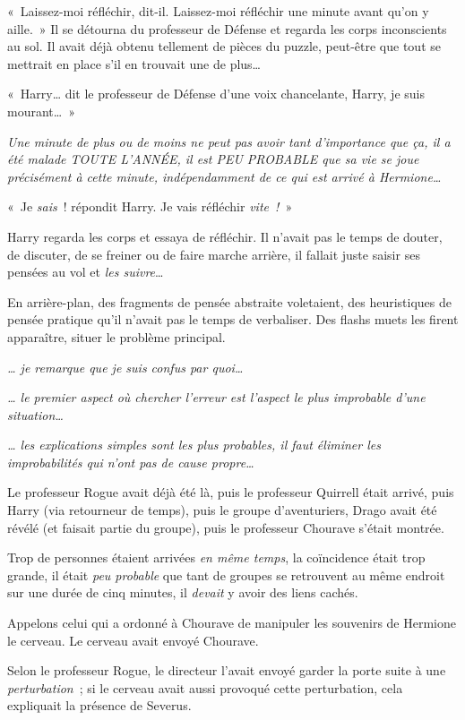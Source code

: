«~Laissez-moi réfléchir, dit-il.
Laissez-moi réfléchir une minute avant qu'on y aille.~»
Il se détourna du professeur de Défense et regarda les corps inconscients au sol.
Il avait déjà obtenu tellement de pièces du puzzle, peut-être que tout se mettrait en place s'il en trouvait une de plus…

«~Harry… dit le professeur de Défense d'une voix chancelante, Harry, je suis mourant…~»

\emph{Une minute de plus ou de moins ne peut pas avoir tant d'importance que ça, il a été malade TOUTE L'ANNÉE, il est PEU PROBABLE que sa vie se joue précisément à cette minute, indépendamment de ce qui est arrivé à Hermione…}

«~Je \emph{sais}~! répondit Harry.
Je vais réfléchir \emph{vite~!}~»

Harry regarda les corps et essaya de réfléchir.
Il n'avait pas le temps de douter, de discuter, de se freiner ou de faire marche arrière, il fallait juste saisir ses pensées au vol et \emph{les suivre}…

En arrière-plan, des fragments de pensée abstraite voletaient, des heuristiques de pensée pratique qu'il n'avait pas le temps de verbaliser.
Des flashs muets les firent apparaître, situer le problème principal.

\emph{… je remarque que je suis confus par quoi…}

\emph{… le premier aspect où chercher l'erreur est l'aspect le plus improbable d'une situation…}

\emph{… les explications simples sont les plus probables, il faut éliminer les improbabilités qui n'ont pas de cause propre…}

Le professeur Rogue avait déjà été là, puis le professeur Quirrell était arrivé, puis Harry (via retourneur de temps), puis le groupe d'aventuriers, Drago avait été révélé (et faisait partie du groupe), puis le professeur Chourave s'était montrée.

Trop de personnes étaient arrivées \emph{en même temps}, la coïncidence était trop grande, il était \emph{peu probable} que tant de groupes se retrouvent au même endroit sur une durée de cinq minutes, il \emph{devait} y avoir des liens cachés.

Appelons celui qui a ordonné à Chourave de manipuler les souvenirs de Hermione le cerveau.
Le cerveau avait envoyé Chourave.

Selon le professeur Rogue, le directeur l'avait envoyé garder la porte suite à une \emph{perturbation}~; si le cerveau avait aussi provoqué cette perturbation, cela expliquait la présence de Severus.


